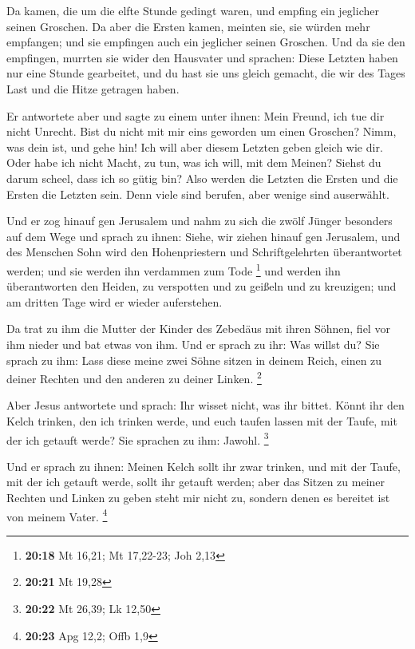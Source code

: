  Da kamen, die um die elfte Stunde gedingt waren, und
empfing ein jeglicher seinen Groschen.  Da aber die Ersten
kamen, meinten sie, sie würden mehr empfangen; und sie empfingen auch
ein jeglicher seinen Groschen.  Und da sie den empfingen,
murrten sie wider den Hausvater  und sprachen: Diese
Letzten haben nur eine Stunde gearbeitet, und du hast sie uns gleich
gemacht, die wir des Tages Last und die Hitze getragen haben.

 Er antwortete aber und sagte zu einem unter ihnen: Mein
Freund, ich tue dir nicht Unrecht. Bist du nicht mit mir eins geworden
um einen Groschen?  Nimm, was dein ist, und gehe hin! Ich
will aber diesem Letzten geben gleich wie dir.  Oder habe
ich nicht Macht, zu tun, was ich will, mit dem Meinen? Siehst du darum
scheel, dass ich so gütig bin?  Also werden die Letzten die
Ersten und die Ersten die Letzten sein. Denn viele sind berufen, aber
wenige sind auserwählt.

 Und er zog hinauf gen Jerusalem und nahm zu sich die zwölf
Jünger besonders auf dem Wege und sprach zu ihnen:  Siehe,
wir ziehen hinauf gen Jerusalem, und des Menschen Sohn wird den
Hohenpriestern und Schriftgelehrten überantwortet werden; und sie werden
ihn verdammen zum Tode \footnote{\textbf{20:18} Mt 16,21; Mt 17,22-23;
  Joh 2,13}  und werden ihn überantworten den Heiden, zu
verspotten und zu geißeln und zu kreuzigen; und am dritten Tage wird er
wieder auferstehen.

 Da trat zu ihm die Mutter der Kinder des Zebedäus mit
ihren Söhnen, fiel vor ihm nieder und bat etwas von ihm. 
Und er sprach zu ihr: Was willst du? Sie sprach zu ihm: Lass diese meine
zwei Söhne sitzen in deinem Reich, einen zu deiner Rechten und den
anderen zu deiner Linken. \footnote{\textbf{20:21} Mt 19,28}

 Aber Jesus antwortete und sprach: Ihr wisset nicht, was
ihr bittet. Könnt ihr den Kelch trinken, den ich trinken werde, und euch
taufen lassen mit der Taufe, mit der ich getauft werde? Sie sprachen zu
ihm: Jawohl. \footnote{\textbf{20:22} Mt 26,39; Lk 12,50}

 Und er sprach zu ihnen: Meinen Kelch sollt ihr zwar
trinken, und mit der Taufe, mit der ich getauft werde, sollt ihr getauft
werden; aber das Sitzen zu meiner Rechten und Linken zu geben steht mir
nicht zu, sondern denen es bereitet ist von meinem Vater. \footnote{\textbf{20:23}
  Apg 12,2; Offb 1,9}

